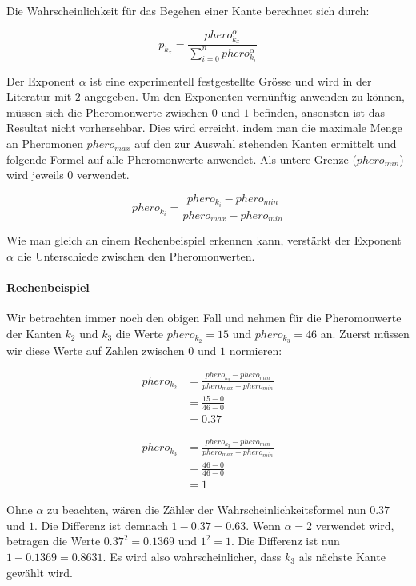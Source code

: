 Die Wahrscheinlichkeit für das Begehen einer Kante berechnet sich durch:

\[ p_{k_x} = \frac{phero_{k_x}^\alpha}{\sum\nolimits_{i=0}^n phero_{k_i}^\alpha}
\]

\noindent Der Exponent $\alpha$ ist eine experimentell festgestellte Grösse und
wird in der Literatur mit $2$ angegeben. Um den Exponenten vernünftig anwenden
zu können, müssen sich die Pheromonwerte zwischen $0$ und $1$ befinden,
ansonsten ist das Resultat nicht vorhersehbar. Dies wird erreicht, indem man die
maximale Menge an Pheromonen $phero_{max}$ auf den zur Auswahl stehenden Kanten
ermittelt und folgende Formel auf alle Pheromonwerte anwendet. Als untere Grenze
($phero_{min}$) wird jeweils $0$ verwendet.

\[ phero_{k_i} = \frac{phero_{k_i} - phero_{min}}{phero_{max} - phero_{min}} \]

\noindent Wie man gleich an einem Rechenbeispiel erkennen kann, verstärkt der
Exponent $\alpha$ die Unterschiede zwischen den Pheromonwerten.

\paragraph*{Rechenbeispiel}

Wir betrachten immer noch den obigen Fall und nehmen für die Pheromonwerte der
Kanten $k_2$ und $k_3$ die Werte $phero_{k_2} = 15 $ und $phero_{k_3} = 46$ an.
Zuerst müssen wir diese Werte auf Zahlen zwischen $0$ und $1$ normieren:

\begin{equation*} \begin{split} phero_{k_2} & = \frac{phero_{k_2} -
phero_{min}}{phero_{max} - phero_{min}} \\ & = \frac{15 - 0}{46 - 0} \\ & = 0.37
\end{split} \end{equation*}

\begin{equation*} \begin{split} phero_{k_3} & = \frac{phero_{k_3} -
phero_{min}}{phero_{max} - phero_{min}} \\ & = \frac{46 - 0}{46 - 0} \\ & = 1
\end{split} \end{equation*}

\noindent Ohne $\alpha$ zu beachten, wären die Zähler der
Wahrscheinlichkeitsformel nun $0.37$ und $1$. Die Differenz ist demnach $1 -
0.37 = 0.63$. Wenn $\alpha = 2$ verwendet wird, betragen die Werte $0.37^2 =
0.1369$ und $1^2 = 1$. Die Differenz ist nun $1 - 0.1369 = 0.8631$. Es wird also
wahrscheinlicher, dass $k_3$ als nächste Kante gewählt wird.

